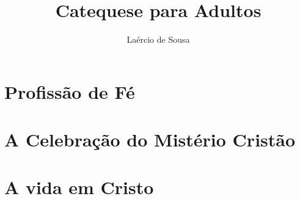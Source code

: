 \documentclass[a4paper]{memoir}
\title{Catequese para Adultos}
\author{Laércio de Sousa}
\begin{document}
\frontmatter
\maketitle
\tableofcontents



\mainmatter

\part{Profissão de Fé}














\part{A Celebração do Mistério Cristão}










\part{A vida em Cristo}






\backmatter
%

\end{document}
